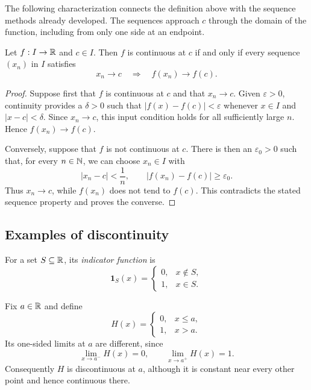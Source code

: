 The following characterization connects the definition above with the
sequence methods already developed. The sequences approach $c$ through
the domain of the function, including from only one side at an endpoint.

\begin{theorem}
  \label{thm:analysis-i:sequential-continuity}
  Let $f:I\to\mathbb{R}$ and $c\in I$. Then $f$ is continuous at $c$ if and only if
  every sequence $(x_n)$ in $I$ satisfies
  \[
    x_n\to c\quad\Longrightarrow\quad f(x_n)\to f(c).
  \]
\end{theorem}

\begin{proof}
  Suppose first that $f$ is continuous at $c$ and that $x_n\to c$.
  Given $\varepsilon>0$, continuity provides a $\delta>0$ such that
  $|f(x)-f(c)|<\varepsilon$ whenever $x\in I$ and $|x-c|<\delta$.
  Since $x_n\to c$, this input condition holds for all sufficiently large
  $n$. Hence $f(x_n)\to f(c)$.

  Conversely, suppose that $f$ is not continuous at $c$. There is then
  an $\varepsilon_0>0$ such that, for every $n\in\mathbb{N}$, we can choose
  $x_n\in I$ with
  \[
    |x_n-c|<\frac1n,
    \qquad |f(x_n)-f(c)|\ge\varepsilon_0.
  \]
  Thus $x_n\to c$, while $f(x_n)$ does not tend to $f(c)$. This contradicts
  the stated sequence property and proves the converse.
\end{proof}




\subsection{Examples of discontinuity}

\begin{definition}
  \label{thm:analysis-i:indicator-function}
  For a set $S\subseteq\mathbb{R}$, its \emph{indicator function} is
  \[
    \mathbf{1}_S(x)=
    \begin{cases}
      0,&x\notin S,\\
      1,&x\in S.
    \end{cases}
  \]
\end{definition}

\begin{example}
  \label{thm:analysis-i:step-discontinuity}
  Fix $a\in\mathbb{R}$ and define
  \[
    H(x)=
    \begin{cases}
      0,&x\le a,\\
      1,&x>a.
    \end{cases}
  \]
  Its one-sided limits at $a$ are different, since
  \[
    \lim_{x\to a^-}H(x)=0,
    \qquad \lim_{x\to a^+}H(x)=1.
  \]
  Consequently $H$ is discontinuous at $a$, although
  it is constant near every other point and hence continuous there.
\end{example}

